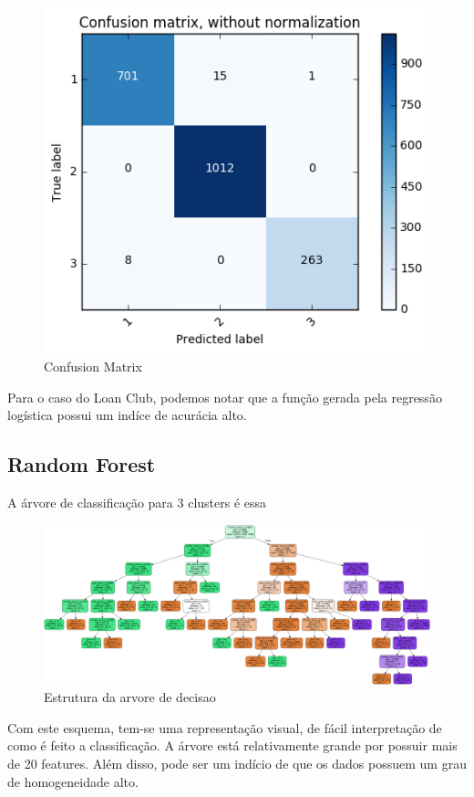 \begin{figure}[!ht]
\caption{Confusion Matrix}
\centerline{\includegraphics[width=.7\textwidth]{img/confusionMatrix}}
\end{figure}


Para o caso do Loan Club, podemos notar que a função gerada pela regressão logística possui um indíce de acurácia alto.

\subsection{Random Forest}

A árvore de classificação para 3 clusters é essa

\begin{figure}[!ht]
\caption{Estrutura da arvore de decisao}
\centerline{\includegraphics[width=1.05\textwidth]{img/loan}}
\end{figure}

Com este esquema, tem-se uma representação visual, de fácil interpretação de como é feito a classificação. A árvore está relativamente grande por possuir mais de 20 features. Além disso, pode ser um indício de que os dados possuem um grau de homogeneidade alto.

